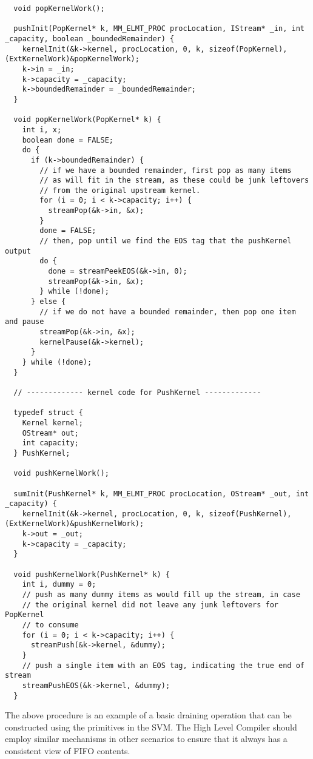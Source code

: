 {\begin{verbatim}
  void popKernelWork();
  
  pushInit(PopKernel* k, MM_ELMT_PROC procLocation, IStream* _in, int _capacity, boolean _boundedRemainder) {
    kernelInit(&k->kernel, procLocation, 0, k, sizeof(PopKernel), (ExtKernelWork)&popKernelWork); 
    k->in = _in;
    k->capacity = _capacity;
    k->boundedRemainder = _boundedRemainder;
  }

  void popKernelWork(PopKernel* k) {
    int i, x;
    boolean done = FALSE;
    do {
      if (k->boundedRemainder) {
        // if we have a bounded remainder, first pop as many items
        // as will fit in the stream, as these could be junk leftovers 
        // from the original upstream kernel.
        for (i = 0; i < k->capacity; i++) {
          streamPop(&k->in, &x);
        }
        done = FALSE;
        // then, pop until we find the EOS tag that the pushKernel output
        do {
          done = streamPeekEOS(&k->in, 0);
          streamPop(&k->in, &x);
        } while (!done);
      } else {
        // if we do not have a bounded remainder, then pop one item and pause
        streamPop(&k->in, &x);
        kernelPause(&k->kernel);
      }
    } while (!done);
  }

  // ------------- kernel code for PushKernel -------------

  typedef struct {
    Kernel kernel;
    OStream* out;
    int capacity;
  } PushKernel;

  void pushKernelWork();
  
  sumInit(PushKernel* k, MM_ELMT_PROC procLocation, OStream* _out, int _capacity) {
    kernelInit(&k->kernel, procLocation, 0, k, sizeof(PushKernel), (ExtKernelWork)&pushKernelWork); 
    k->out = _out;
    k->capacity = _capacity;
  }

  void pushKernelWork(PushKernel* k) {
    int i, dummy = 0;
    // push as many dummy items as would fill up the stream, in case
    // the original kernel did not leave any junk leftovers for PopKernel 
    // to consume
    for (i = 0; i < k->capacity; i++) {
      streamPush(&k->kernel, &dummy);
    }
    // push a single item with an EOS tag, indicating the true end of stream
    streamPushEOS(&k->kernel, &dummy);
  }
\end{verbatim}}

The above procedure is an example of a basic draining operation that
can be constructed using the primitives in the SVM.  The High Level
Compiler should employ similar mechanisms in other scenarios to ensure
that it always has a consistent view of FIFO contents.

